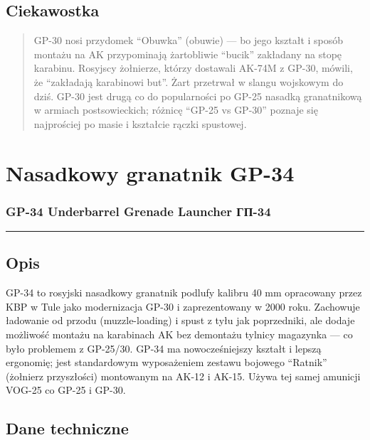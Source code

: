 \documentclass[12pt,openany,oneside]{book}
\begin{document}
\section{Ciekawostka}\label{ciekawostka-80}

\begin{quote}
GP-30 nosi przydomek ``Obuwka'' (obuwie) --- bo jego kształt i sposób
montażu na AK przypominają żartobliwie ``bucik'' zakładany na stopę
karabinu. Rosyjscy żołnierze, którzy dostawali AK-74M z GP-30, mówili,
że ``zakładają karabinowi but''. Żart przetrwał w slangu wojskowym do
dziś. GP-30 jest drugą co do popularności po GP-25 nasadką granatnikową
w armiach postsowieckich; różnicę ``GP-25 vs GP-30'' poznaje się
najprościej po masie i kształcie rączki spustowej.
\end{quote}

\chapter{Nasadkowy granatnik GP-34}\label{nasadkowy-granatnik-gp-34}

\subsection{GP-34 Underbarrel Grenade Launcher \textbar{}
ГП-34}\label{gp-34-underbarrel-grenade-launcher-ux433ux43f-34}

\begin{center}\rule{0.5\linewidth}{0.5pt}\end{center}

\section{Opis}\label{opis-81}

GP-34 to rosyjski nasadkowy granatnik podlufy kalibru 40 mm opracowany
przez KBP w Tule jako modernizacja GP-30 i zaprezentowany w 2000 roku.
Zachowuje ładowanie od przodu (muzzle-loading) i spust z tyłu jak
poprzedniki, ale dodaje możliwość montażu na karabinach AK bez demontażu
tylnicy magazynka --- co było problemem z GP-25/30. GP-34 ma
nowocześniejszy kształt i lepszą ergonomię; jest standardowym
wyposażeniem zestawu bojowego ``Ratnik'' (żołnierz przyszłości)
montowanym na AK-12 i AK-15. Używa tej samej amunicji VOG-25 co GP-25 i
GP-30.

\section{Dane techniczne}\label{dane-techniczne-81}
\end{document}

